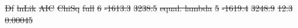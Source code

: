 \documentclass[10pt,letterpaper]{article} %
\providecommand{\DIFdel}[1]{{\protect\color{red}\sout{#1}}}                      %
\providecommand{\DIFaddbegin}{} %
\providecommand{\DIFaddend}{} %
\providecommand{\DIFdelbegin}{} %
\providecommand{\DIFdelend}{} %
\begin{document}
\DIFdelbegin %
{%
}
\DIFdel{Df           }%
\DIFdel{lnLik }%
\DIFdel{AIC     }%
\DIFdel{ChiSq  }%
\DIFdel{full         }%
\DIFdel{6     }%
\DIFdel{-1613.3 }%
\DIFdel{3238.5 }%
\DIFdel{equal.
lambda }%
\DIFdel{5     }%
\DIFdel{-1619.4 }%
\DIFdel{3248.9 }%
\DIFdel{12.3                  }%
\DIFdel{0.00045
}%
\DIFdelend \DIFaddbegin \nolinenumbers
\DIFaddend 


\DIFdelbegin %
\DIFdelend {}
\DIFdelbegin %
\DIFdelend 
\end{document}
